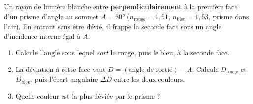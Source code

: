 \documentclass[11pt,a4paper]{article}
\begin{document}
\begin{exo}
Un rayon de lumière blanche entre \textbf{perpendiculairement} à la première face d'un prisme d'angle
au sommet $A=\ang{30}$ ($n_{\text{rouge}}=1{,}51$, $n_{\text{bleu}}=1{,}53$, prisme dans l'air). En
entrant sans être dévié, il frappe la seconde face sous un angle d'incidence interne égal à $A$.
\begin{center}
\end{center}
\begin{enumerate}[label=\alph*)]
  \item Calcule l'angle sous lequel \emph{sort} le rouge, puis le bleu, à la seconde face.
  \item La déviation à cette face vaut $D=(\text{angle de sortie})-A$. Calcule $D_{\text{rouge}}$ et
        $D_{\text{bleu}}$, puis l'écart angulaire $\Delta D$ entre les deux couleurs.
  \item Quelle couleur est la plus déviée par le prisme ?
\end{enumerate}
\end{exo}
\end{document}
